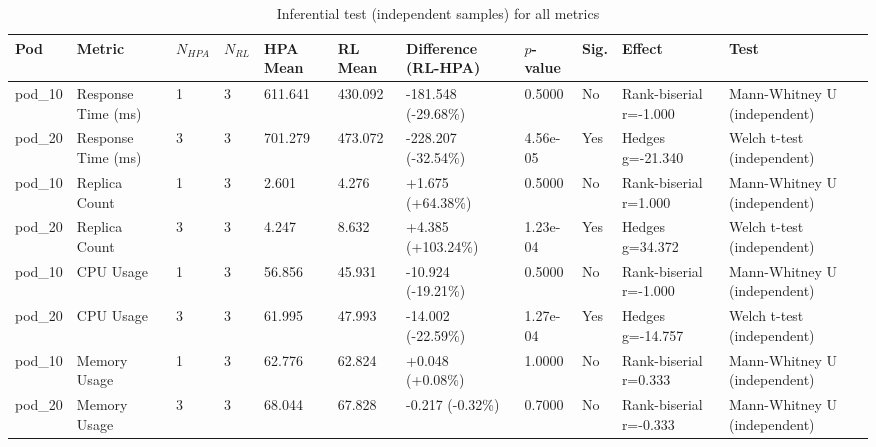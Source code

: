 \begin{table}[ht]
  \centering
  \caption{Inferential test (independent samples) for all metrics}\label{tab:inferensial-all-metrics}
  \begin{tabular}{lllllllllll}
    \toprule
    Pod & Metric & $N_{HPA}$ & $N_{RL}$ & HPA Mean & RL Mean & Difference (RL-HPA) & $p$-value & Sig. & Effect & Test \\
    \midrule
    pod\_10 & Response Time (ms) & 1 & 3 & 611.641 & 430.092 & -181.548 (-29.68\%) & 0.5000 & No & Rank-biserial r=-1.000 & Mann-Whitney U (independent) \\
    pod\_20 & Response Time (ms) & 3 & 3 & 701.279 & 473.072 & -228.207 (-32.54\%) & 4.56e-05 & Yes & Hedges g=-21.340 & Welch t-test (independent) \\
    pod\_10 & Replica Count & 1 & 3 & 2.601 & 4.276 & +1.675 (+64.38\%) & 0.5000 & No & Rank-biserial r=1.000 & Mann-Whitney U (independent) \\
    pod\_20 & Replica Count & 3 & 3 & 4.247 & 8.632 & +4.385 (+103.24\%) & 1.23e-04 & Yes & Hedges g=34.372 & Welch t-test (independent) \\
    pod\_10 & CPU Usage & 1 & 3 & 56.856 & 45.931 & -10.924 (-19.21\%) & 0.5000 & No & Rank-biserial r=-1.000 & Mann-Whitney U (independent) \\
    pod\_20 & CPU Usage & 3 & 3 & 61.995 & 47.993 & -14.002 (-22.59\%) & 1.27e-04 & Yes & Hedges g=-14.757 & Welch t-test (independent) \\
    pod\_10 & Memory Usage & 1 & 3 & 62.776 & 62.824 & +0.048 (+0.08\%) & 1.0000 & No & Rank-biserial r=0.333 & Mann-Whitney U (independent) \\
    pod\_20 & Memory Usage & 3 & 3 & 68.044 & 67.828 & -0.217 (-0.32\%) & 0.7000 & No & Rank-biserial r=-0.333 & Mann-Whitney U (independent) \\
    \bottomrule
  \end{tabular}
\end{table}